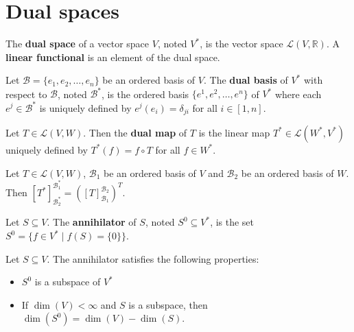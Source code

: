 \documentclass{bareminimum}
\begin{document}
	
	\section{Dual spaces}
	
	
	\begin{defn}
		The \textbf{dual space}  of a vector space $V$, noted $V^*$, is the vector space $\mathcal{L}(V, \mathbb{R})$. A \textbf{linear functional} is an element of the dual space.
	\end{defn}
	
	\begin{defn}
		Let $\mathcal{B} = \{e_1, e_2, \ldots, e_n\}$ be an ordered basis of $V$.  The \textbf{dual basis} of $V^*$ with respect to $\mathcal{B}$, noted $\mathcal{B}^*$, is the ordered basis $\{e^1, e^2, \ldots, e^n\}$ of $V^*$ where each $e^j \in \mathcal{B}^*$ is uniquely defined by $e^j(e_i) = \delta_{ji}$ for all $i \in [1,n]$.
	\end{defn}
	
	\begin{defn}
		Let $T \in \mathcal{L}(V, W)$.  Then the \textbf{dual map} of $T$ is the linear map $T^* \in \mathcal{L}(W^*, V^*)$ uniquely defined by $T^*(f) = f \circ T$ for all $f \in W^*$.
	\end{defn}
	
	\begin{prop}
		Let $T \in \mathcal{L}(V,W)$, $\mathcal{B}_1$ be an ordered basis of $V$ and $\mathcal{B}_2$ be an ordered basis of $W$. Then $[T^*]_{\mathcal{B}_2^*}^{\mathcal{B}_1^*} = ([T]_{\mathcal{B}_1}^{\mathcal{B}_2})^T$.
	\end{prop}
	
	\begin{defn}[Annihilator]
		Let $S \subseteq V$.  The \textbf{annihilator} of $S$, noted $S^0 \subseteq V^*$, is the set $S^0 = \{ f \in V^* \mid f(S) = \{ 0 \} \}$.
	\end{defn}
	
	\begin{prop}
		Let $S \subseteq V$. The annihilator satisfies the following properties:
		\begin{itemize}
			\item $S^0$ is a subspace of $V^*$
			\item If $\dim(V) < \infty$ and $S$ is a subspace, then $\dim(S^0) = \dim(V) - \dim(S)$.
		\end{itemize}
	\end{prop}
	
\end{document}
